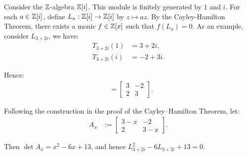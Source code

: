\begin{example}
	Consider the $\mathbb{Z}$-algebra $\mathbb{Z}[i]$. This module is finitely generated by $1$ and $i$. For each $a \in \mathbb{Z}[i]$, define $L_a :\mathbb{Z}[i] \rightarrow \mathbb{Z}[i]$ by $z \mapsto az$. By the Cayley-Hamilton Theorem, there exists a monic $f \in \mathbb{Z}[x]$ such that $f(L_a) = 0$. As an example, consider $L_{3+2i}$, we have:
	\begin{align*}
T_{3+2i}(1) &= 3+2i,\\
T_{3+2i}(i) &= -2+3i.
\end{align*}

Hence:
\begin{align*}
[T] &= \begin{bmatrix}
3 & -2\\
2 & 3
\end{bmatrix}.
\end{align*}

Following the construction in the proof of the Cayley--Hamilton Theorem, let:
\begin{align*}
A_x &:= \begin{bmatrix}
3-x & -2\\
2 & 3-x
\end{bmatrix}.
\end{align*}

Then $\det A_x=x^2-6x+13$, and hence $L_{3+2i}^{2}-6L_{3+2i}+13=0$.
\end{example}

